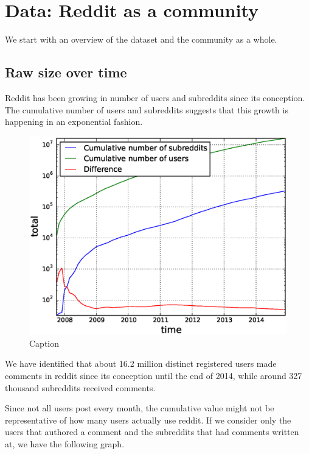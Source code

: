\section{Data: Reddit as a community}

We start with an overview of the dataset and the community as a whole.
\subsection{Raw size over time}

Reddit has been growing in number of users and subreddits since its conception. The cumulative number of users and subreddits suggests that this growth is happening in an exponential fashion.

\begin{figure}[!tb]
\centering
\includegraphics[scale=0.4]{./images/cumulative_users_subreddits.eps}
\caption{Caption}
\label{fig:cumulative_users_subreddits}
\end{figure}

We have identified that about 16.2 million distinct registered users made comments in reddit since its conception until the end of 2014, while around 327 thousand subreddits received comments. 

Since not all users post every month, the cumulative value might not be representative of how many users actually use reddit. If we consider only the users that authored a comment and the subreddits that had comments written at, we have the following graph.

